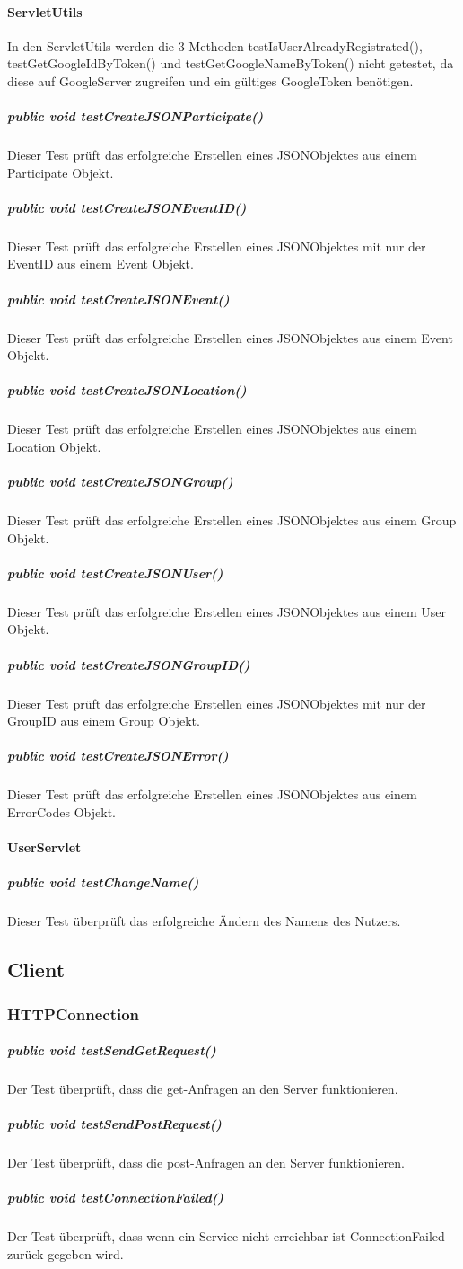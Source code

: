 \documentclass{scrartcl}
\begin{document}
	\paragraph{ServletUtils}
	In den ServletUtils werden die 3 Methoden testIsUserAlreadyRegistrated(), testGetGoogleIdByToken() und testGetGoogleNameByToken() nicht getestet, da diese auf GoogleServer zugreifen und ein gültiges GoogleToken benötigen.
	\subparagraph{public void testCreateJSONParticipate()}
	Dieser Test prüft das erfolgreiche Erstellen eines JSONObjektes aus einem Participate Objekt.
	\subparagraph{public void testCreateJSONEventID()}
	Dieser Test prüft das erfolgreiche Erstellen eines JSONObjektes mit nur der EventID aus einem Event Objekt.
	\subparagraph{public void testCreateJSONEvent()}
	Dieser Test prüft das erfolgreiche Erstellen eines JSONObjektes aus einem Event Objekt.
	\subparagraph{public void testCreateJSONLocation()}
	Dieser Test prüft das erfolgreiche Erstellen eines JSONObjektes aus einem Location Objekt.
	\subparagraph{public void testCreateJSONGroup()}
	Dieser Test prüft das erfolgreiche Erstellen eines JSONObjektes aus einem Group Objekt.	
	\subparagraph{public void testCreateJSONUser()}
	Dieser Test prüft das erfolgreiche Erstellen eines JSONObjektes aus einem User Objekt.	
	\subparagraph{public void testCreateJSONGroupID()}
	Dieser Test prüft das erfolgreiche Erstellen eines JSONObjektes mit nur der GroupID aus einem Group Objekt.	
	\subparagraph{public void testCreateJSONError() }
	Dieser Test prüft das erfolgreiche Erstellen eines JSONObjektes aus einem ErrorCodes Objekt.

	\paragraph{UserServlet}	
	\subparagraph{public void testChangeName()}
	Dieser Test überprüft das erfolgreiche Ändern des Namens des Nutzers.
	
	\subsection{Client}
	\subsubsection{HTTPConnection}
	\subparagraph{public void testSendGetRequest()}	
	Der Test überprüft, dass die get-Anfragen an den Server funktionieren.
	\subparagraph{public void testSendPostRequest()}
	Der Test überprüft, dass die post-Anfragen an den Server funktionieren.
	\subparagraph{public void testConnectionFailed()}
	Der Test überprüft, dass wenn ein Service nicht erreichbar ist ConnectionFailed zurück gegeben wird.
\end{document}
